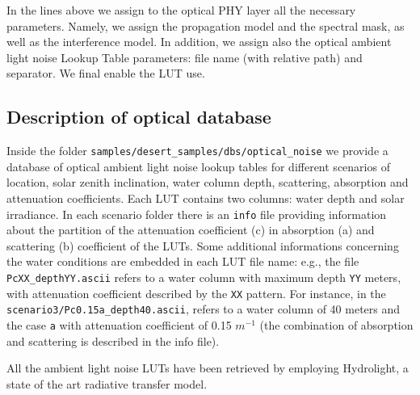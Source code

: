 \documentclass[11pt]{article}
\begin{document}
In the lines above we assign to the optical PHY layer all the necessary parameters. Namely, we assign the propagation model and the spectral mask, as well as the interference model. In addition, we assign also the optical ambient light noise Lookup Table parameters: file name (with relative path) and separator. We final enable the LUT use.

\subsection{Description of  optical database}
Inside the folder {\tt samples/desert\_samples/dbs/optical\_noise} we provide a database of optical ambient light noise lookup tables for different scenarios of location, solar zenith inclination, water column depth, scattering, absorption and attenuation coefficients. 
Each LUT contains two columns: water depth and solar irradiance.
In each scenario folder there is an {\tt info} file providing information about the partition of the attenuation coefficient (c) in absorption (a) and scattering (b) coefficient of the LUTs. Some additional informations concerning the water conditions are embedded in each LUT file name: e.g., the file {\tt PcXX\_depthYY.ascii} refers to a water column with maximum depth {\tt YY} meters, with attenuation coefficient described by the {\tt XX} pattern. For instance, in the {\tt scenario3/Pc0.15a\_depth40.ascii}, refers to a water column of 40 meters and the case {\tt a} with attenuation coefficient of 0.15 $m^{-1}$ (the combination of absorption and scattering is described in the info file).

All the ambient light noise LUTs have been retrieved by employing Hydrolight, a state of the art radiative transfer model.
\end{document}
